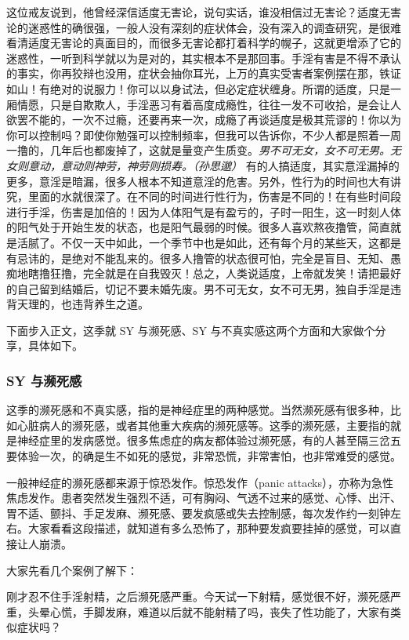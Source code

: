 \begin{case}
    这位戒友说到，他曾经深信适度无害论，说句实话，谁没相信过无害论？适度无害论的迷惑性的确很强，一般人没有深刻的症状体会，没有深入的调查研究，是很难看清适度无害论的真面目的，而很多无害论都打着科学的幌子，这就更增添了它的迷惑性，一听到科学就以为是对的，其实根本不是那回事。手淫有害是不得不承认的事实，你再狡辩也没用，症状会抽你耳光，上万的真实受害者案例摆在那，铁证如山！有绝对的说服力！你可以以身试法，但必定症状缠身。所谓的适度，只是一厢情愿，只是自欺欺人，手淫恶习有着高度成瘾性，往往一发不可收拾，是会让人欲罢不能的，一次不过瘾，还要再来一次，成瘾了再谈适度是极其荒谬的！你以为你可以控制吗？即使你勉强可以控制频率，但我可以告诉你，不少人都是照着一周一撸的，几年后也都废掉了，这就是量变产生质变。\textit{男不可无女，女不可无男。无女则意动，意动则神劳，神劳则损寿。（孙思邈）} 有的人搞适度，其实意淫漏掉的更多，意淫是暗漏，很多人根本不知道意淫的危害。另外，性行为的时间也大有讲究，里面的水就很深了。在不同的时间进行性行为，伤害是不同的！在有些时间段进行手淫，伤害是加倍的！因为人体阳气是有盈亏的，子时一阳生，这一时刻人体的阳气处于开始生发的状态，也是阳气最弱的时候。很多人喜欢熬夜撸管，简直就是活腻了。不仅一天中如此，一个季节中也是如此，还有每个月的某些天，这都是有忌讳的，是绝对不能乱来的。很多人撸管的状态很可怕，完全是盲目、无知、愚痴地瞎撸狂撸，完全就是在自我毁灭！总之，人类说适度，上帝就发笑！请把最好的自己留到结婚后，切记不要未婚先废。男不可无女，女不可无男，独自手淫是违背天理的，也违背养生之道。
\end{case}

下面步入正文，这季就 SY 与濒死感、SY 与不真实感这两个方面和大家做个分享，具体如下。

\subsubsection{SY 与濒死感}

这季的濒死感和不真实感，指的是神经症里的两种感觉。当然濒死感有很多种，比如心脏病人的濒死感，或者其他重大疾病的濒死感等。这季的濒死感，主要指的就是神经症里的发病感觉。很多焦虑症的病友都体验过濒死感，有的人甚至隔三岔五要体验一次，的确是生不如死的感觉，非常恐慌，非常害怕，也非常难受的感觉。

一般神经症的濒死感都来源于惊恐发作。惊恐发作（panic attacks），亦称为急性焦虑发作。患者突然发生强烈不适，可有胸闷、气透不过来的感觉、心悸、出汗、胃不适、颤抖、手足发麻、濒死感、要发疯感或失去控制感，每次发作约一刻钟左右。大家看看这段描述，就知道有多么恐怖了，那种要发疯要挂掉的感觉，可以直接让人崩溃。

大家先看几个案例了解下：

\begin{case}[濒死感]
    刚才忍不住手淫射精，之后濒死感严重。今天试一下射精，感觉很不好，濒死感严重，头晕心慌，手脚发麻，难道以后就不能射精了吗，丧失了性功能了，大家有类似症状吗？
\end{case}

